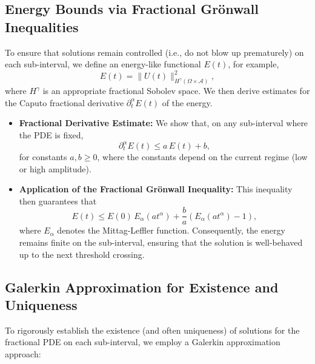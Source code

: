 \documentclass[12pt]{article}
\begin{document}
\medskip

\subsection{Energy Bounds via Fractional Grönwall Inequalities}
To ensure that solutions remain controlled (i.e., do not blow up prematurely) on each sub-interval, we define an energy-like functional $E(t)$, for example,
\[
  E(t) = \|U(t)\|^2_{H^\gamma(\Omega \times \mathcal{A})},
\]
where $H^\gamma$ is an appropriate fractional Sobolev space. We then derive estimates for the Caputo fractional derivative $\partial_t^\alpha E(t)$ of the energy.

\begin{itemize}
    \item \textbf{Fractional Derivative Estimate:}  
          We show that, on any sub-interval where the PDE is fixed,
          \[
            \partial_t^\alpha E(t) \le a \, E(t) + b,
          \]
          for constants $a,b \ge 0$, where the constants depend on the current regime (low or high amplitude).
          
    \item \textbf{Application of the Fractional Grönwall Inequality:}  
          This inequality then guarantees that 
          \[
            E(t) \le E(0) \, E_{\alpha}(at^\alpha) + \frac{b}{a}\left(E_{\alpha}(at^\alpha)-1\right),
          \]
          where $E_{\alpha}$ denotes the Mittag-Leffler function. Consequently, the energy remains finite on the sub-interval, ensuring that the solution is well-behaved up to the next threshold crossing.
\end{itemize}

\medskip

\subsection{Galerkin Approximation for Existence and Uniqueness}
To rigorously establish the existence (and often uniqueness) of solutions for the fractional PDE on each sub-interval, we employ a Galerkin approximation approach:
\end{document}
